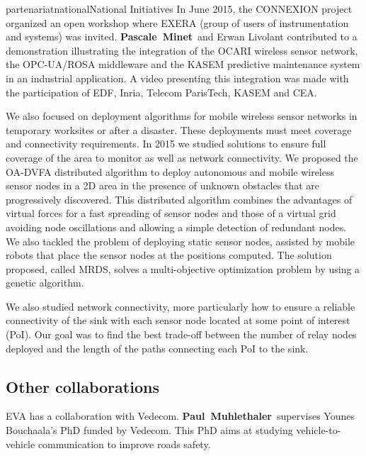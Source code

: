 \documentclass{ra2016}
\newcommand{\paul}  {\textbf{Paul~Muhlethaler}}
\newcommand{\pascale} {\textbf{Pascale~Minet}}
\begin{document}
\begin{module}{partenariat}{national}{National Initiatives}
In June 2015, the CONNEXION project organized an open workshop where EXERA (group of users of instrumentation and systems) was invited.  \pascale~and Erwan Livolant contributed to a demonstration illustrating the integration of the OCARI wireless sensor network, the OPC-UA/ROSA middleware and the KASEM predictive maintenance system in an industrial application. A video presenting this integration was made with the participation of EDF, Inria, Telecom ParisTech, KASEM and CEA.

We also focused on deployment algorithms for mobile wireless sensor networks in temporary worksites or after a disaster. These deployments must meet coverage and connectivity requirements. In 2015 we studied solutions to ensure full coverage of the area to monitor as well as network connectivity. We proposed the OA-DVFA distributed algorithm to deploy autonomous and mobile wireless sensor nodes in a 2D area in the presence of unknown obstacles that are progressively discovered. This distributed algorithm combines the advantages of virtual forces for a fast spreading of sensor nodes and those of a virtual grid avoiding node oscillations and allowing a simple detection of redundant nodes. We also tackled the problem of deploying static sensor nodes, assisted by mobile robots that place the sensor nodes at the positions computed. The solution proposed, called MRDS, solves a multi-objective optimization problem by using a genetic algorithm.

We also studied network connectivity, more particularly how to ensure a reliable connectivity of the sink with each sensor node located at some point of interest (PoI). Our goal was to find the best trade-off between the number of relay nodes deployed and the length of the paths connecting each PoI to the sink.

\subsection{Other collaborations}

EVA has a collaboration with Vedecom. 
\paul~supervises Younes Bouchaala's PhD funded by Vedecom. This PhD aims at 
studying vehicle-to-vehicle communication to improve roads safety. 

\end{module} 




\end{document}
